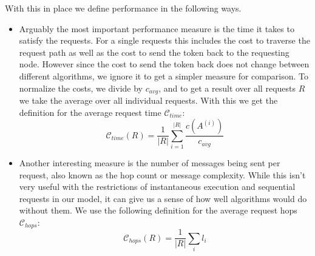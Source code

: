 \documentclass[a4paper, oneside]{discothesis}
\begin{document}
With this in place we define performance in the following ways.
\begin{itemize}
\item
  Arguably the most important performance measure is the time it takes to satisfy the requests. For a single requests this includes the cost to traverse the request path as well as the cost to send the token back to the requesting node. However since the cost to send the token back does not change between different algorithms, we ignore it to get a simpler measure for comparison. To normalize the costs, we divide by $c_{avg}$, and to get a result over all requests $R$ we take the average over all individual requests. With this we get the definition for the average request time $\mathcal{C}_{time}$:
  \begin{equation}
    \mathcal{C}_{time}(R) = \frac{1}{|R|}\sum_{i=1}^{|R|}\frac{c(A^{(i)})}{c_{avg}}
  \end{equation}

\item
  Another interesting measure is the number of messages being sent per request, also known as the hop count or message complexity. While this isn't very useful with the restrictions of instantaneous execution and sequential requests in our model, it can give us a sense of how well algorithms would do without them. We use the following definition for the average request hops $\mathcal{C}_{hops}$:
  \begin{equation}
    \mathcal{C}_{hops}(R) = \frac{1}{|R|}\sum_il_i
  \end{equation}
\end{itemize}
\end{document}
